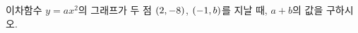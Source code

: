 이차함수 $y=ax^2$의 그래프가 두 점 $(2{,}\mkern3mu\mathopen{}-8)$, $(-1{,}\mkern3mu\mathopen{}b)$를 지날 때, $a+b$의 값을 구하시오. 
